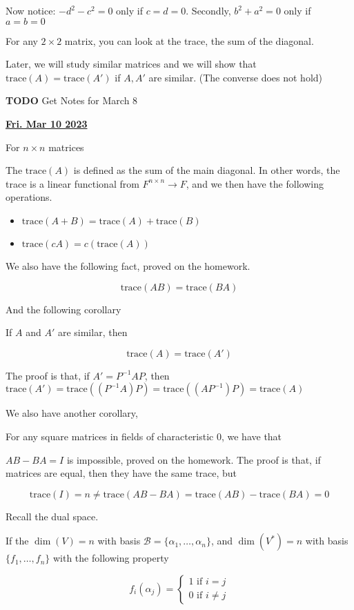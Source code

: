 \documentclass[12pt]{article}
\renewcommand{\date}[1]{\underline{\bf #1}}
\def\trace{\text{trace}}
\def\B{\mathcal B}
\newcommand{\TODO}{\color{red}\textbf{TODO}\color{black}}
\begin{document}
  Now notice: $-d^2 - c^2 = 0$ only if $c = d = 0$. Secondly, $b^2 + a^2 = 0$
  only if $a = b = 0$

  For any $2 \times 2$ matrix, you can look at the trace, the sum of the
  diagonal.

  Later, we will study similar matrices and we will show that $\text{trace}(A) =
  \text{trace}(A')$ if $A, A'$ are similar. (The converse does not hold)

  \TODO{} Get Notes for March 8

  \date{Fri. Mar 10 2023}

  For $n \times n$ matrices

  The $\trace(A)$ is defined as the sum of the main diagonal. In other words,
  the trace is a linear functional from $F^{n \times n} \to F$, and we then have
  the following operations.

  \begin{itemize}
    \item $\trace(A + B) = \trace(A) + \trace(B)$
    \item $\trace(cA) = c(\trace(A))$
  \end{itemize}

  We also have the following fact, proved on the homework.

  \[
    \trace(AB) = \trace(BA)
  \]

  And the following corollary

  If $A$ and $A'$ are similar, then

  \[
    \trace(A) = \trace(A')
  \]

  The proof is that, if $A' = P^{-1} A P$, then $\trace(A') = \trace((P^{-1} A) P)
  = \trace((A P^{-1}) P) = \trace(A)$

  We also have another corollary,

  For any square matrices in fields of characteristic $0$, we have that

  $AB - BA = I$ is impossible, proved on the homework. The proof is that, if
  matrices are equal, then they have the same trace, but

  \[
    \trace(I) = n \ne \trace(AB - BA) = \trace(AB) - \trace(BA) = 0
  \]

  Recall the dual space.

  If the $\dim(V) = n$ with basis $\B = \{\alpha_1, \dots, \alpha_n\}$, and
  $\dim(V^*) = n$ with basis $\{f_1, \dots, f_n \}$ with the following property

  \[
    f_i(\alpha_j) = \begin{cases}
      1 \text{ if $i = j$} \\
      0 \text{ if $i \ne j$}
    \end{cases}
  \]
\end{document}
